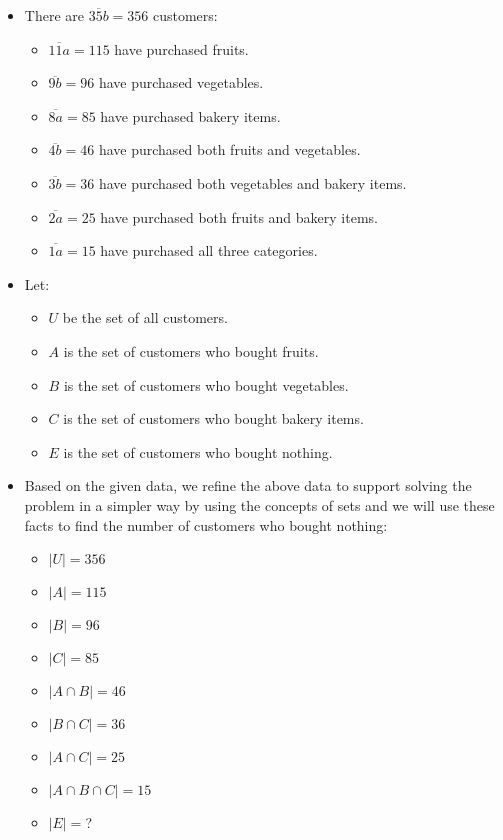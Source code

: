 \documentclass[12pt, a4paper, twoside]{report} %
\begin{document}
  \begin{itemize}
    \item There are $\overline{35b} = 356$ customers:
    \begin{itemize}
      \item $\overline{11a} = 115$ have purchased fruits.
      \item $\overline{9b} = 96$ have purchased vegetables.
      \item $\overline{8a} = 85$ have purchased bakery items.
      \item $\overline{4b} = 46$ have purchased both fruits and vegetables.
      \item $\overline{3b} = 36$ have purchased both vegetables and bakery items.
      \item $\overline{2a} = 25$ have purchased both fruits and bakery items.
      \item $\overline{1a} = 15$ have purchased all three categories.
    \end{itemize}
    \item Let:
    \begin{itemize}
      \item $U$ be the set of all customers.
      \item $A$ is the set of customers who bought fruits.
      \item $B$ is the set of customers who bought vegetables.
      \item $C$ is the set of customers who bought bakery items.
      \item $E$ is the set of customers who bought nothing.
    \end{itemize}
    \item Based on the given data, we refine the above data to support solving the problem in a simpler way by using the concepts of sets and we will use these facts to find the number of customers who bought nothing:
    \begin{itemize}
      \item $|U| = 356$
      \item $|A| = 115$
      \item $|B| = 96$
      \item $|C| = 85$
      \item $|A \cap B| = 46$
      \item $|B \cap C| = 36$
      \item $|A \cap C| = 25$
      \item $|A \cap B \cap C| = 15$
      \item $|E| = $?
    \end{itemize}
  \end{itemize}
\end{document}
